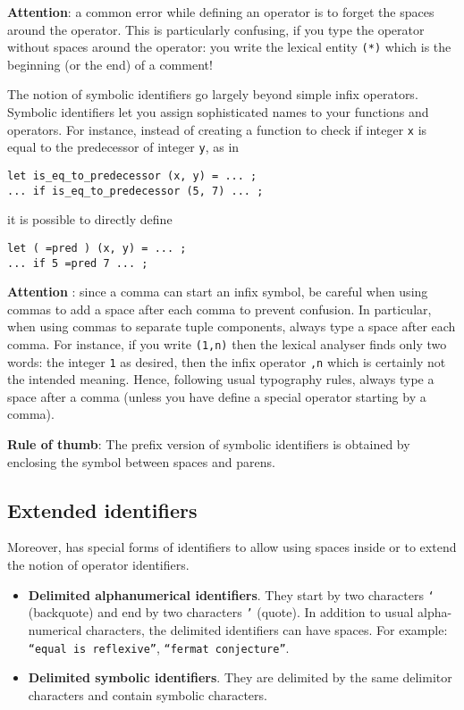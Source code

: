{\bf Attention}: a common error while defining an operator is to forget
the spaces around the operator. This is particularly confusing, if you
type the {\tt *} operator without spaces around the operator: you
write the lexical entity {\tt (*)} which is the beginning (or the end)
of a comment!

The {\focal} notion of symbolic identifiers go largely beyond simple
infix operators. Symbolic identifiers let you assign sophisticated names
to your functions and operators.
For instance, instead of creating a function to check if integer {\tt x}
is equal to the predecessor of integer {\tt y}, as in
{\scriptsize
\begin{lstlisting}
let is_eq_to_predecessor (x, y) = ... ;
... if is_eq_to_predecessor (5, 7) ... ;
\end{lstlisting}
}
it is possible to directly define
{\scriptsize
\begin{lstlisting}
let ( =pred ) (x, y) = ... ;
... if 5 =pred 7 ... ;
\end{lstlisting}
}

{\bf Attention} : since a comma can start an infix symbol, be careful
when using commas to add a space after each comma to prevent confusion.
In particular, when using commas to separate tuple components, always type
a space after each comma. For instance, if you write {\tt (1,n)}
then the lexical analyser finds only two words: the integer {\tt 1} as
desired, then the infix operator {\tt ,n} which is certainly not the
intended meaning. Hence, following usual typography rules, always type a
space after a comma (unless you have define a special operator starting
by a comma).

{\bf Rule of thumb}: The prefix version of symbolic identifiers is obtained
by enclosing the symbol between spaces and parens.

\subsection{Extended identifiers}
\label{extended-identifiers}

Moreover, {\focal} has special forms of identifiers to allow using
spaces inside or to extend the notion of operator identifiers.
\begin{itemize}
  \item {\bf Delimited alphanumerical identifiers}.
    They start by two characters {\tt `} (backquote) and end by two
    characters {\tt '} (quote). In addition to usual alpha-numerical
    characters, the delimited identifiers can have spaces. For example:
    {\tt ``equal is reflexive''}, {\tt ``fermat conjecture''}.
  \item {\bf Delimited symbolic identifiers}.
    They are delimited by the same delimitor characters and contain
    symbolic characters.
\end{itemize}

